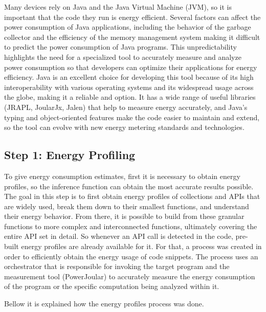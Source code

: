 \documentclass[sigplan]{acmart}
\begin{document}
Many devices rely on Java and the Java Virtual Machine (JVM), so it is important that the code they run is energy efficient. Several factors can affect the power consumption of Java applications, including the behavior of the garbage collector and the efficiency of the memory management system \cite{10.5555/1267847.1267870} making it difficult to predict the power consumption of Java programs. This unpredictability highlights the need for a specialized tool to accurately measure and analyze power consumption so that developers can optimize their applications for energy efficiency.
Java is an excellent choice for developing this tool because of its high interoperability with various operating systems and its widespread usage across the globe, making it a reliable and option. It has a wide range of useful libraries (JRAPL, JoularJx, Jalen) that help to measure energy accurately, and Java's typing and object-oriented features make the code easier to maintain and extend, so the tool can evolve with new energy metering standards and technologies. 

\subsection{Step 1: Energy Profiling} \label{sec:work_step1_energy_profiling}

To give energy consumption estimates, first it is necessary to obtain energy profiles, so the inference function can obtain the most accurate results possible. The goal in this step is to first obtain energy profiles of collections and APIs that are widely used, break them down to their smallest functions, and understand their energy behavior. From there, it is possible to build from these granular functions to more complex and interconnected functions, ultimately covering the entire API set in detail. So whenever an API call is detected in the code, pre-built energy profiles are already available for it.
For that, a process was created in order to efficiently obtain the energy usage of code snippets.
The process uses an orchestrator that is responsible for invoking the target program and the measurement tool (PowerJoular) to accurately measure the energy consumption of the program or the specific computation being analyzed within it.

Bellow it is explained how the energy profiles process was done.
\end{document}
